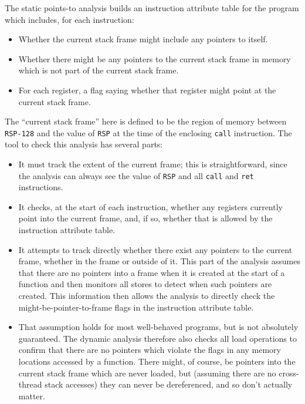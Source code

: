 \label{sect:eval:validate:pta}

The static points-to analysis builds an instruction attribute table for the program which includes, for each instruction:

\begin{itemize}
\item
  Whether the current stack frame might include any pointers to itself.
\item
  Whether there might be any pointers to the current stack frame in memory which is not part of the current stack frame.
\item
  For each register, a flag saying whether that register might point at the current stack frame.
\end{itemize}

The ``current stack frame'' here is defined to be the region of memory between \verb|RSP-128| and the value of \verb|RSP| at the time of the enclosing \verb|call| instruction.
The tool to check this analysis has several parts:

\begin{itemize}
\item
  It must track the extent of the current frame; this is straightforward, since the analysis can always see the value of \verb|RSP| and all \verb|call| and \verb|ret| instructions.
\item
  It checks, at the start of each instruction, whether any registers currently point into the current frame, and, if so, whether that is allowed by the instruction attribute table.
\item
  It attempts to track directly whether there exist any pointers to the current frame, whether in the frame or outside of it.
  This part of the analysis assumes that there are no pointers into a frame when it is created at the start of a function and then monitors all stores to detect when such pointers are created.
  This information then allows the analysis to directly check the might-be-pointer-to-frame flags in the instruction attribute table.
\item
  That assumption holds for most well-behaved programs, but is not absolutely guaranteed.
  The dynamic analysis therefore also checks all load operations to confirm that there are no pointers which violate the flags in any memory locations accessed by a function.
  There might, of course, be pointers into the current stack frame which are never loaded, but (assuming there are no cross-thread stack accesses) they can never be dereferenced, and so don't actually matter.
\end{itemize}

